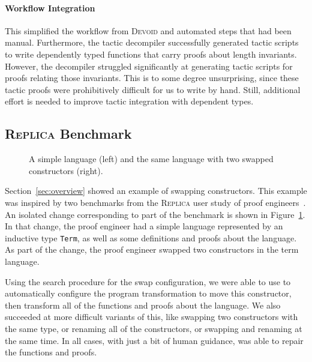 \paragraph{Workflow Integration}
This simplified the workflow from \textsc{Devoid} and automated steps that had been manual.
Furthermore, the tactic decompiler successfully generated tactic scripts to write dependently typed
functions that carry proofs about length invariants.
However, the decompiler struggled significantly at generating tactic scripts for proofs relating those invariants.
This is to some degree unsurprising, since these tactic proofs
were prohibitively difficult for us to write by hand.
Still, additional effort is needed to improve tactic integration with dependent types.

\subsection{\textsc{Replica} Benchmark}
\label{sec:replica}

\begin{figure}
\begin{minipage}{0.48\textwidth}
   
\end{minipage}
\hfill
\begin{minipage}{0.48\textwidth}
   
\end{minipage}
\caption{A simple language (left) and the same language with two swapped constructors (right).}
\label{fig:replica}
\end{figure}

Section~\ref{sec:overview} showed an example of swapping constructors.
This example was inspired by two benchmarks from the \textsc{Replica} user study of proof engineers~\cite{replica}.
An isolated change corresponding to part of the benchmark is shown in Figure~\ref{fig:replica}.
In that change, the proof engineer had a simple language represented by an inductive type \lstinline{Term},
as well as some definitions and proofs about the language.
As part of the change, the proof engineer swapped two constructors in the term language.

Using the search procedure for the swap configuration, we were able to use \toolname
to automatically configure the program transformation to move this constructor,
then transform all of the functions and proofs about the language.
We also succeeded at more difficult variants of this,
like swapping two constructors with the same type, or renaming all of the constructors,
or swapping and renaming at the same time.
In all cases, with just a bit of human guidance, \toolname was able to repair the functions and proofs.

